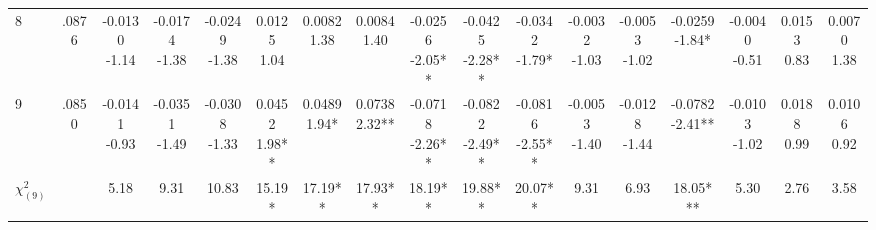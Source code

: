 \begin{landscape}
\begin{center}
{\begin{adjustbox}{max width=\textheight}
\begin{tabular}{lcccccccccccccccc}
8 & .0876 & \shortstack{-0.0130\\-1.14} & \shortstack{-0.0174\\-1.38} & \shortstack{-0.0249\\-1.38} & \shortstack{0.0125\\1.04} & \shortstack{0.0082\\1.38} & \shortstack{0.0084\\1.40} & \shortstack{-0.0256\\-2.05**} & \shortstack{-0.0425\\-2.28**} & \shortstack{-0.0342\\-1.79*} & \shortstack{-0.0032\\-1.03} & \shortstack{-0.0053\\-1.02} & \shortstack{-0.0259\\-1.84*} & \shortstack{-0.0040\\-0.51} & \shortstack{0.0153\\0.83} & \shortstack{0.0070\\1.38} \\
9 & .0850 & \shortstack{-0.0141\\-0.93} & \shortstack{-0.0351\\-1.49} & \shortstack{-0.0308\\-1.33} & \shortstack{0.0452\\1.98**} & \shortstack{0.0489\\1.94*} & \shortstack{0.0738\\2.32**} & \shortstack{-0.0718\\-2.26**} & \shortstack{-0.0822\\-2.49**} & \shortstack{-0.0816\\-2.55**} & \shortstack{-0.0053\\-1.40} & \shortstack{-0.0128\\-1.44} & \shortstack{-0.0782\\-2.41**} & \shortstack{-0.0103\\-1.02} & \shortstack{0.0188\\0.99} & \shortstack{0.0106\\0.92} \\
$\chi^2_{(9)}$ &  & 5.18 & 9.31 & 10.83 & 15.19* & 17.19** & 17.93** & 18.19** & 19.88** & 20.07** & 9.31 & 6.93 & 18.05*** & 5.30 & 2.76 & 3.58 \\
\bottomrule
\end{tabular}
\end{adjustbox}}
\end{center}
\end{landscape}

